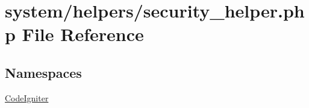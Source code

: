 \hypertarget{security__helper_8php}{\section{system/helpers/security\-\_\-helper.php File Reference}
\label{security__helper_8php}
}
\subsection*{Namespaces}
\begin{DoxyCompactItemize}
\item 
\hyperlink{namespace_code_igniter}{Code\-Igniter}
\end{DoxyCompactItemize}
